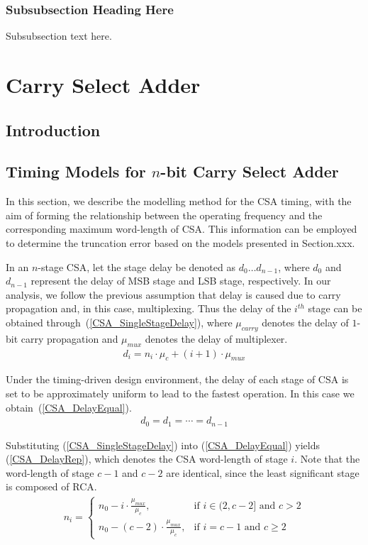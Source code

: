 \documentclass[journal]{IEEEtran}
\begin{document}
\subsubsection{Subsubsection Heading Here}
Subsubsection text here.

\section{Carry Select Adder}
\subsection{Introduction}

\subsection{Timing Models for $n$-bit Carry Select Adder}
In this section, we describe the modelling method for the CSA timing, with the aim of forming the relationship between the operating frequency and the corresponding maximum word-length of CSA. This information can be employed to determine the truncation error based on the models presented in Section.xxx.

In an $n$-stage CSA, let the stage delay be denoted as $d_{0}\dots d_{n-1}$, where $d_{0}$ and $d_{n-1}$ represent the delay of MSB stage and LSB stage, respectively. In our analysis, we follow the previous assumption that delay is caused due to carry propagation and, in this case, multiplexing. Thus the delay of the $i^{th}$ stage can be obtained through~(\ref{CSA_SingleStageDelay}), where $\mu_{carry}$ denotes the delay of $1$-bit carry propagation and $\mu_{mux}$ denotes the delay of multiplexer.
\begin{eqnarray}\label{CSA_SingleStageDelay}
  d_i=n_i\cdot \mu_{c}+(i+1)\cdot\mu_{mux} 
\end{eqnarray}

Under the timing-driven design environment, the delay of each stage of CSA is set to be approximately uniform to lead to the fastest operation. In this case we obtain~(\ref{CSA_DelayEqual}).
\begin{eqnarray}\label{CSA_DelayEqual}
  d_0=d_1=\cdots=d_{n-1}
\end{eqnarray}

Substituting (\ref{CSA_SingleStageDelay}) into (\ref{CSA_DelayEqual}) yields (\ref{CSA_DelayRep}), which denotes the CSA word-length of stage $i$. Note that the word-length of stage $c-1$ and $c-2$ are identical, since the least significant stage is composed of RCA.
\begin{eqnarray}\label{CSA_DelayRep}
 n_i=\left\{
	\begin{matrix}
	  n_0-i\cdot\frac{\mu_{mux}}{\mu_c}, & \textrm{if $i\in(2,c-2]$ and $c>2$}\\
	  n_0-(c-2)\cdot\frac{\mu_{mux}}{\mu_c}, & \textrm{if $i=c-1$ and $c\geqslant2$}
	\end{matrix}
    \right.
\end{eqnarray}
\end{document}
